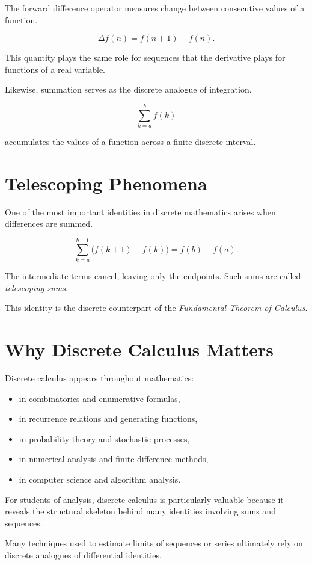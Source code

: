 The forward difference operator measures change between consecutive values of a
function.

\[
\Delta f(n) = f(n+1) - f(n).
\]

This quantity plays the same role for sequences that the derivative plays for
functions of a real variable.

Likewise, summation serves as the discrete analogue of integration.

\[
\sum_{k=a}^{b} f(k)
\]

accumulates the values of a function across a finite discrete interval.

\section*{Telescoping Phenomena}

One of the most important identities in discrete mathematics arises when
differences are summed.

\[
\sum_{k=a}^{b-1} \bigl(f(k+1)-f(k)\bigr)
=
f(b)-f(a).
\]

The intermediate terms cancel, leaving only the endpoints. Such sums are called
\emph{telescoping sums}.

This identity is the discrete counterpart of the
\emph{Fundamental Theorem of Calculus}.

\section*{Why Discrete Calculus Matters}

Discrete calculus appears throughout mathematics:

\begin{itemize}
\item in combinatorics and enumerative formulas,
\item in recurrence relations and generating functions,
\item in probability theory and stochastic processes,
\item in numerical analysis and finite difference methods,
\item in computer science and algorithm analysis.
\end{itemize}

For students of analysis, discrete calculus is particularly valuable because it
reveals the structural skeleton behind many identities involving sums and
sequences.

Many techniques used to estimate limits of sequences or series ultimately rely
on discrete analogues of differential identities.

